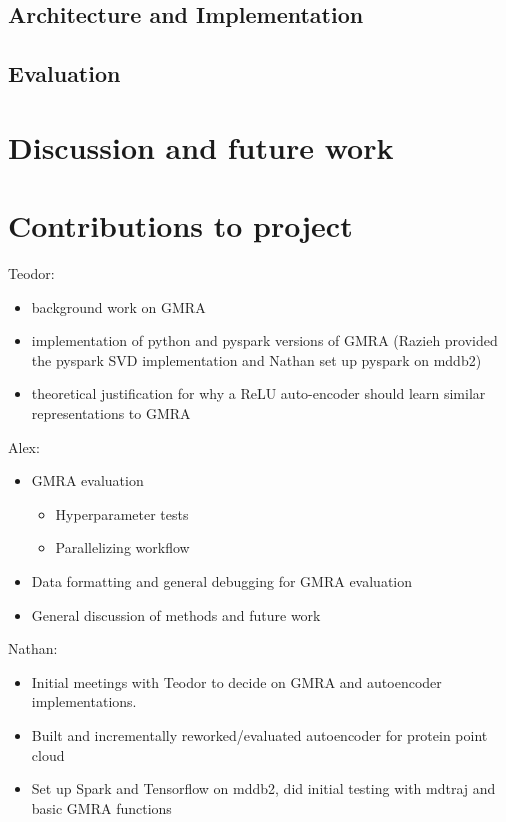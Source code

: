 \documentclass{article}
\begin{document}
\subsection{Architecture and Implementation}
{\color{red}{TODO:}}
\subsection{Evaluation}
{\color{red}{TODO:}}

\section{Discussion and future work}
{\color{red}{TODO:}}

\section{Contributions to project}
Teodor:
\begin{itemize}
\item background work on GMRA
\item implementation of python and pyspark versions of GMRA (Razieh provided the pyspark SVD implementation and Nathan set up pyspark on mddb2)
\item theoretical justification for why a ReLU auto-encoder should learn similar representations to GMRA
\end{itemize}

Alex:
\begin{itemize}
	\item GMRA evaluation
	\begin{itemize}
		\item Hyperparameter tests
		\item Parallelizing workflow
	\end{itemize}
	\item Data formatting and general debugging for GMRA evaluation
	\item General discussion of methods and future work
\end{itemize}

Nathan:
\begin{itemize}
	\item Initial meetings with Teodor to decide on GMRA and autoencoder implementations.
	\item Built and incrementally reworked/evaluated autoencoder for protein point cloud
	\item Set up Spark and Tensorflow on mddb2, did initial testing with mdtraj and basic GMRA functions
\end{itemize}

{\color{red}{TODO:}}

\small
{}

\end{document}
